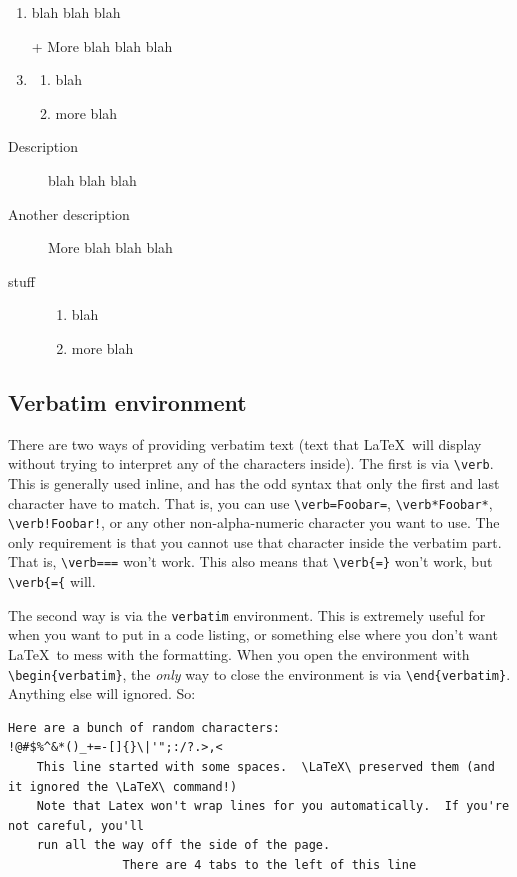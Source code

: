 \documentclass[letterpaper]{article}
\begin{document}
\begin{enumerate}
\item blah blah blah
\item[+]  More blah blah blah
\item   \begin{enumerate}
        \item blah
        \item more blah
        \end{enumerate}
\end{enumerate}

\begin{description}
\item[Description] blah blah blah
\item[Another description]  More blah blah blah
\item [stuff]   
\begin{enumerate}
\item blah
\item more blah
\end{enumerate}
\end{description}

\subsection{Verbatim environment}

There are two ways of providing verbatim text (text that \LaTeX\ will 
display without trying to interpret any of the characters inside).  The 
first is via \verb+\verb+.  This is generally used inline, and has the 
odd syntax that only the first and last character have to match.  That 
is, you can use \verb+\verb=Foobar=+, \verb+\verb*Foobar*+, 
\verb+\verb!Foobar!+, or any other non-alpha-numeric character you want 
to use.  The only requirement is that you cannot use that character 
inside the verbatim part.  That is, \verb+\verb===+ won't work.  This 
also means that \verb+\verb{=}+ won't work, but \verb+\verb{={+ will.

The second way is via the \verb+verbatim+ environment.  This is 
extremely useful for when you want to put in a code listing, or 
something else where you don't want \LaTeX\ to mess with the formatting.  
When you open the environment with \verb+\begin{verbatim}+, the 
\emph{only} way to close the environment is via \verb+\end{verbatim}+.  
Anything else will ignored.  So:

\begin{verbatim}
Here are a bunch of random characters:
!@#$%^&*()_+=-[]{}\|'";:/?.>,<
    This line started with some spaces.  \LaTeX\ preserved them (and it ignored the \LaTeX\ command!)
    Note that Latex won't wrap lines for you automatically.  If you're not careful, you'll
    run all the way off the side of the page.
				There are 4 tabs to the left of this line
\end{verbatim}
\end{document}

